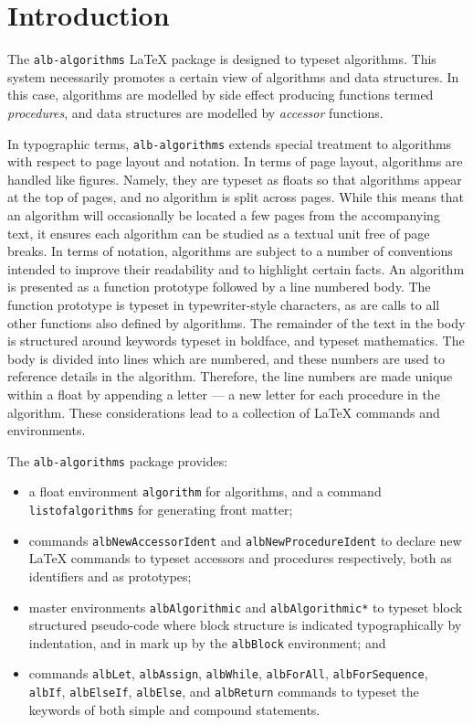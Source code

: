 \documentclass[11pt,a4paper,oneside,titlepage]{alb-corp}
\begin{document}

\section{Introduction}
\label{sec:alb-algorithms-documentation:intr}

The \texttt{alb-algorithms} \LaTeX{} package is designed to typeset
algorithms.  This system necessarily promotes a certain view of
algorithms and data structures.  In this case, algorithms are modelled
by side effect producing functions termed \emph{procedures}, and data
structures are modelled by \emph{accessor} functions.

In typographic terms, \texttt{alb-algorithms} extends special treatment
to algorithms with respect to page layout and notation.  In terms of
page layout, algorithms are handled like figures.  Namely, they are
typeset as floats so that algorithms appear at the top of pages, and no
algorithm is split across pages.  While this means that an algorithm
will occasionally be located a few pages from the accompanying text, it
ensures each algorithm can be studied as a textual unit free of page
breaks.  In terms of notation, algorithms are subject to a number of
conventions intended to improve their readability and to highlight
certain facts.  An algorithm is presented as a function prototype
followed by a line numbered body.  The function prototype is typeset in
typewriter-style characters, as are calls to all other functions also
defined by algorithms.  The remainder of the text in the body is
structured around keywords typeset in boldface, and typeset mathematics.
The body is divided into lines which are numbered, and these numbers are
used to reference details in the algorithm.  Therefore, the line numbers
are made unique within a float by appending a letter --- a new letter
for each procedure in the algorithm.  These considerations lead to a
collection of \LaTeX{} commands and environments.

The \texttt{alb-algorithms} package provides:
\begin{itemize}
\item a float environment \texttt{algorithm} for algorithms, and a
  command \texttt{listofalgorithms} for generating front matter;
\item commands \texttt{albNewAccessorIdent} and
  \texttt{albNewProcedureIdent} to declare new \LaTeX{} commands to
  typeset accessors and procedures respectively, both as identifiers and
  as prototypes;
\item master environments \texttt{albAlgorithmic} and
  \texttt{albAlgorithmic*} to typeset block structured pseudo-code where
  block structure is indicated typographically by indentation, and in
  mark up by the \texttt{albBlock} environment; and
\item commands \texttt{albLet}, \texttt{albAssign}, \texttt{albWhile},
  \texttt{albForAll}, \texttt{albForSequence}, \texttt{albIf},
  \texttt{albElseIf}, \texttt{albElse}, and \texttt{albReturn} commands
  to typeset the keywords of both simple and compound statements.
\end{itemize}
\end{document}
